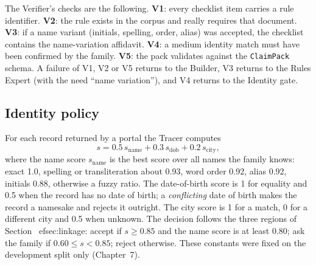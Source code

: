 The Verifier's checks are the following. \textbf{V1}: every checklist item carries a rule identifier. \textbf{V2}: the rule exists in the corpus and really requires that document. \textbf{V3}: if a name variant (initials, spelling, order, alias) was accepted, the checklist contains the name-variation affidavit. \textbf{V4}: a medium identity match must have been confirmed by the family. \textbf{V5}: the pack validates against the \texttt{ClaimPack} schema. A failure of V1, V2 or V5 returns to the Builder, V3 returns to the Rules Expert (with the need ``name variation''), and V4 returns to the Identity gate.

\subsection{Identity policy}\label{sec:identity}
For each record returned by a portal the Tracer computes
\begin{equation}
s = 0.5\,s_{\text{name}} + 0.3\,s_{\text{dob}} + 0.2\,s_{\text{city}},
\end{equation}
where the name score $s_{\text{name}}$ is the best score over all names the family knows: exact 1.0, spelling or transliteration about 0.93, word order 0.92, alias 0.92, initials 0.88, otherwise a fuzzy ratio. The date-of-birth score is 1 for equality and 0.5 when the record has no date of birth; a \emph{conflicting} date of birth makes the record a namesake and rejects it outright. The city score is 1 for a match, 0 for a different city and 0.5 when unknown. The decision follows the three regions of Section~
ef{sec:linkage}: accept if $s\ge 0.85$ and the name score is at least 0.80; ask the family if $0.60\le s<0.85$; reject otherwise. These constants were fixed on the development split only (Chapter~7).

